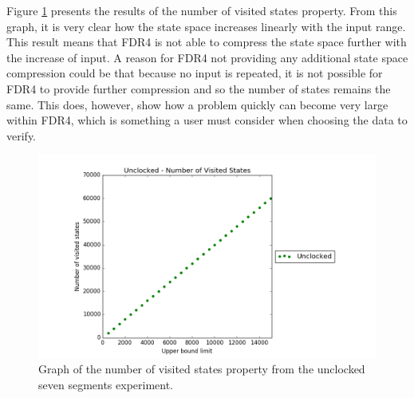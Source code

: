 Figure \ref{fig:unclocked_states} presents the results of the number of visited states property. From this graph, it is very clear how the state space increases linearly with the input range. This result means that FDR4 is not able to compress the state space further with the increase of input. A reason for FDR4 not providing any additional state space compression could be that because no input is repeated, it is not possible for FDR4 to provide further compression and so the number of states remains the same. This does, however, show how a problem quickly can become very large within FDR4, which is something a user must consider when choosing the data to verify.
\begin{figure}
    \centering
    \includegraphics[scale=0.6]{./figures/plots/unclocked_states.png}
\caption{Graph of the number of visited states property from the unclocked seven segments experiment.}
\label{fig:unclocked_states}
\end{figure}
